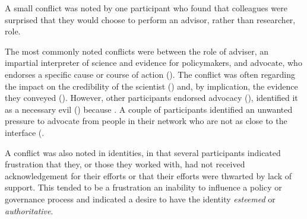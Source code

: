 A small conflict was noted by one participant who found that colleagues were surprised that they would choose to perform an advisor, rather than researcher, role.

The most commonly noted conflicts were between the role of adviser, an impartial interpreter of science and evidence for policymakers, and advocate, who endorses a specific cause or course of action (). The conflict was often regarding the impact on the credibility of the scientist () and, by implication, the evidence they conveyed (). However, other participants endorsed advocacy (), identified it as a necessary evil () because . A couple of participants identified an unwanted pressure to advocate from people in their network who are not as close to the interface (.

A conflict was also noted in identities, in that several participants indicated frustration that they, or those they worked with, had not received acknowledgement for their efforts or that their efforts were thwarted by lack of support. This tended to be a frustration an inability to influence a policy or governance process and indicated a desire to have the identity \emph{esteemed} or \emph{authoritative}.

